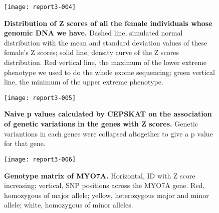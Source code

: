 \documentclass{article}
\begin{document}
\begin{figure}[htb]
\centering
\texttt{[image: report3-004]}

\caption{{\bf {Distribution of Z scores of all the female individuals whose genomic DNA we have.}} Dashed line, simulated normal distribution with the mean and standard deviation values of these female's Z scores; solid line, density curve of the Z scores distribution. Red vertical line, the maximum of the lower extreme phenotype we used to do the whole exome sequencing; green vertical line, the minimum of the upper extreme phenotype. }
\label{fig:zdistr}
\end{figure}


\begin{figure}[htb]
\centering
\texttt{[image: report3-005]}

\caption{{\bf {Naive p values calculated by CEPSKAT on the association of genetic variations in the genes with Z scores.}} Genetic variantions in each genes were collapsed altogether to give a p value for that gene. }
\label{fig:allP}
\end{figure}

\begin{figure}[htb]
\centering
\texttt{[image: report3-006]}

\caption{{\bf {Genotype matrix of MYO7A.}} Horizontal, ID with Z score increasing; vertical, SNP positions across the MYO7A gene. Red, homozygous of major allele; yellow, heterozygous major and minor allele; white, homozygous of minor alleles.}
\label{fig:myo7a}
\end{figure}
\end{document}
